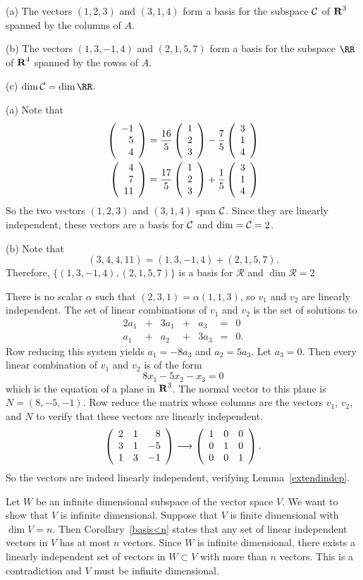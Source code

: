\ans (a) The vectors $(1,2,3)$ and $(3,1,4)$ form a basis for the subspace
	${\cal C}$ of $\mbox{$\bf{R}$}^3$ spanned by the columns of $A$.

(b) The vectors $(1,3,-1,4)$ and $(2,1,5,7)$ form a basis for the subspace
	$\RR$ of $\mbox{$\bf{R}$}^4$ spanned by the rowss of $A$.

(c) $\dim \CC = \dim \RR$.

\soln (a) Note that 
\begin{eqnarray*} 
\left(\begin{array}{r} -1 \\ 5 \\ 4\end{array}\right) = \frac{16}{5}\left(\begin{array}{r} 1 \\ 2 \\ 3\end{array}\right) 
	- \frac{7}{5}\left(\begin{array}{r} 3 \\ 1 \\ 4\end{array}\right) \\ 
\left(\begin{array}{r} 4 \\ 7 \\ 11\end{array}\right) = \frac{17}{5}\left(\begin{array}{r} 1 \\ 2 \\ 3\end{array}\right) 
	+ \frac{1}{5}\left(\begin{array}{r} 3 \\ 1 \\ 4\end{array}\right)
\end{eqnarray*}
So the two vectors $(1, 2, 3)$ and $(3,1,4)$ span ${\cal C}$.  Since they are 
linearly independent, these vectors are a basis for ${\cal C}$ and $\dim ={\cal C}=2$.

(b) Note that 
\[
(3,4,4,11) = (1,3,-1,4) + (2,1,5,7).
\]
Therefore, $\{(1,3,-1,4),(2,1,5,7)\}$ is a basis for $\mathcal{R}$ and 
$\dim \mathcal{R}=2$


There is no scalar $\alpha$ such that $(2,3,1) = \alpha(1,1,3)$, so
$v_1$ and $v_2$ are linearly independent.
The set of linear combinations of $v_1$ and $v_2$ is the set of
solutions to
\[
\begin{array}{rrrrrrl}
2a_1 & + & 3a_1 & + & a_3 & = & 0 \\
a_1 & + & a_2 & + & 3a_3 & = & 0. \end{array}
\]
Row reducing this system yields $a_1 = -8a_3$ and $a_2 = 5a_3$.
Let $a_3 = 0$.  Then every linear combination of $v_1$ and $v_2$ is
of the form
\[
8x_1 - 5x_2 - x_3 = 0
\]
which is the equation of a plane in $\mbox{$\bf{R}$}^3$.  The normal vector to this
plane is $N = (8,-5,-1)$.  Row reduce the matrix whose columns
are the vectors $v_1$, $v_2$, and $N$ to verify that these vectors
are linearly independent.
\[
\left(\begin{array}{rrr} 2 & 1 & 8 \\ 3 & 1 & -5 \\ 1 & 3 & -1\end{array}\right) \longrightarrow
\left(\begin{array}{rrr} 1 & 0 & 0 \\ 0 & 1 & 0 \\ 0 & 0 & 1\end{array}\right).
\]
So the vectors are indeed linearly independent, verifying
Lemma~\ref{extendindep}.

  Let $W$ be an infinite dimensional subspace of the vector 
space $V$.  We want to show that $V$ is infinite dimensional.  Suppose that
$V$ is finite dimensional with $\dim V=n$.  Then Corollary~\ref{basis<n}
states that any set of linear independent 
vectors in $V$ has at most $n$ vectors.  Since $W$ is infinite dimensional, 
there exists a linearly independent set of vectors in $W\subset V$ with more 
than $n$ vectors.  This is a contradiction and $V$ must be infinite 
dimensional.

